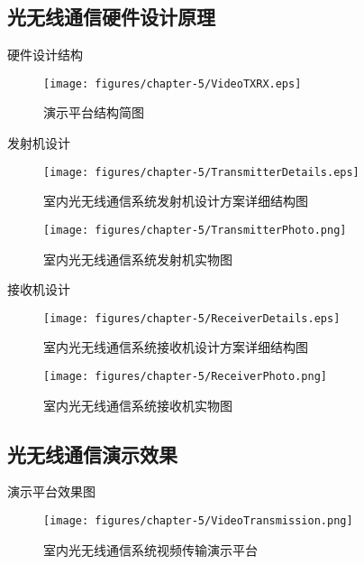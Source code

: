 \documentclass[mathserif, utf8, 9pt]{beamer}
\begin{document}
\subsection{光无线通信硬件设计原理}
\begin{frame}{硬件设计结构}
    \begin{figure}[htbp]
        \centering
    	\texttt{[image: figures/chapter-5/VideoTXRX.eps]}
    	\caption{演示平台结构简图}
    \end{figure}
\end{frame}

\begin{frame}{发射机设计}
    \vspace{-0.5em}
    \begin{figure}[htbp]
        \centering
    	\texttt{[image: figures/chapter-5/TransmitterDetails.eps]}
    	\caption{室内光无线通信系统发射机设计方案详细结构图}
    \end{figure}
    \vspace{-1.5em}
    \begin{figure}[htbp]
        \centering
    	\texttt{[image: figures/chapter-5/TransmitterPhoto.png]}
    	\caption{室内光无线通信系统发射机实物图}
    \end{figure}
\end{frame}

\begin{frame}{接收机设计}
    \vspace{-0.5em}
    \begin{figure}[htbp]
        \centering
    	\texttt{[image: figures/chapter-5/ReceiverDetails.eps]}
    	\caption{室内光无线通信系统接收机设计方案详细结构图}
    \end{figure}
    \vspace{-1.5em}
    \begin{figure}[htbp]
        \centering
    	\texttt{[image: figures/chapter-5/ReceiverPhoto.png]}
    	\caption{室内光无线通信系统接收机实物图}
    \end{figure}
\end{frame}

\subsection{光无线通信演示效果}
\begin{frame}{演示平台效果图}
    \begin{figure}[htbp]
        \centering
    	\texttt{[image: figures/chapter-5/VideoTransmission.png]}
    	\caption{室内光无线通信系统视频传输演示平台}
    \end{figure}
\end{frame}
\end{document}
